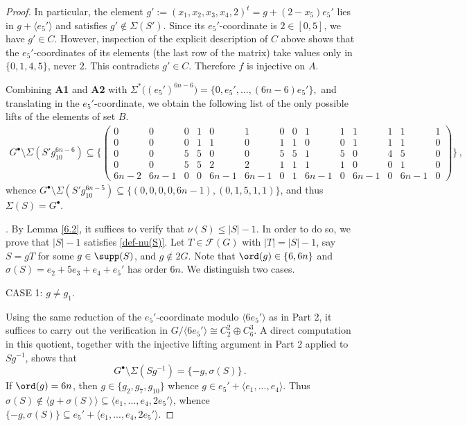 \documentclass[a4paper, 10pt]{amsart}
\theoremstyle{plain}
\theoremstyle{definition}
\numberwithin{equation}{section}
\begin{document}
{\begin{proof}
	In particular, the element
	$g' := (x_1, x_2, x_3, x_4, 2)^t = g + (2 - x_5) e_5'$
	lies in $g + \langle e_5'\rangle$ and satisfies $g' \notin \Sigma(S')$.
	Since its $e_5'$-coordinate is $2 \in [0, 5]$, we have
	$g' \in C$. However, inspection of the explicit description
	of $C$ above shows that the $e_5'$-coordinates of its
	elements (the last row of the matrix) take values only in
	$\{0, 1, 4, 5\}$, never $2$. This contradicts $g' \in C$.
	Therefore $f$ is injective on $A$.


\medskip
Combining {\bf A1} and {\bf A2} with
$
\Sigma^*\bigl((e_5')^{6n-6}\bigr)
=\{0,e_5',\ldots,(6n-6)e_5'\},
$
and translating in the $e_5'$-coordinate, we obtain the following
list of the only possible lifts of the elements of set $B$.
\begin{align*}
G^{\bullet} \setminus \Sigma (S'g_{10}^{6n-6}) \subseteq
\{\left(\begin{array}{l|l|l|l|l|l|l|l|l|l|l|l|l|l}
	0 & 0 & 0 & 1 & 0 & 1 & 0 & 0 & 1 & 1 & 1 & 1 & 1 & 1\\
	0 & 0 & 0 & 1 & 1 & 0 & 1 & 1 & 0 & 0 & 1 & 1 & 1 & 0\\
	0 & 0 & 5 & 5 & 0 & 0 & 5 & 5 & 1 & 5 & 0 & 4 & 5 & 0\\
	0 & 0 & 5 & 5 & 2 & 2 & 1 & 1 & 1 & 1 & 0 & 0 & 1 & 0\\
	6n-2 & 6n-1 & 0 & 0 & 6n-1 & 6n-1 & 0 & 1 & 6n-1 & 0 & 6n-1 & 0 & 6n-1 & 0
\end{array}\right)
\} \,,
\end{align*}
whence $G^{\bullet} \setminus \Sigma (S'g_{10}^{6n-5})\subseteq \{(0,0,0,0,6n-1),(0,1,5,1,1)\}$, and thus $\Sigma(S)=G^{\bullet}$. 

. By Lemma \ref{6.2}, it suffices to verify that  $\nu (S) \le |S|-1$. In order to do so, we prove that
$|S| - 1$ satisfies \eqref{def-nu(S)}. Let $T \in \mathcal F (G)$ with $|T|=|S|-1$, say $S = gT$ for some $g \in \supp (S)$, and $g\notin 2G$.  Note that $\ord(g) \in \{6, 6n\}$  and  $\sigma(S) = e_2 + 5e_3 + e_4+e_5'$ has order $6n$. We distinguish two cases.

\smallskip
\noindent
CASE 1: $g \neq g_1$.

Using the same reduction of the $e_5'$-coordinate modulo
$\langle 6e_5'\rangle$ as in Part 2, it suffices to carry out the
verification in $
G/\langle 6e_5'\rangle\cong C_2^2\oplus C_6^3.$
A direct computation in this quotient, together with the injective lifting argument in Part 2 applied to $Sg^{-1}$, shows that 
\[
	G^{\bullet} \setminus \Sigma(Sg^{-1})=\{-g, \sigma (S) \} \,.
\]
If $\ord(g)=6n$, then $g\in\{g_2,g_7,g_{10} \}$ whence $g \in e_5'+\langle e_1,...,e_4\rangle$. Thus $\sigma (S) \notin \langle g+ \sigma (S) \rangle \subseteq \langle e_1,...,e_4,2e_5'\rangle$, whence $\{-g, \sigma (S) \} \subseteq e_5' + \langle e_1,...,e_4,2e_5'\rangle$.
		

\end{proof}}
\end{document}
